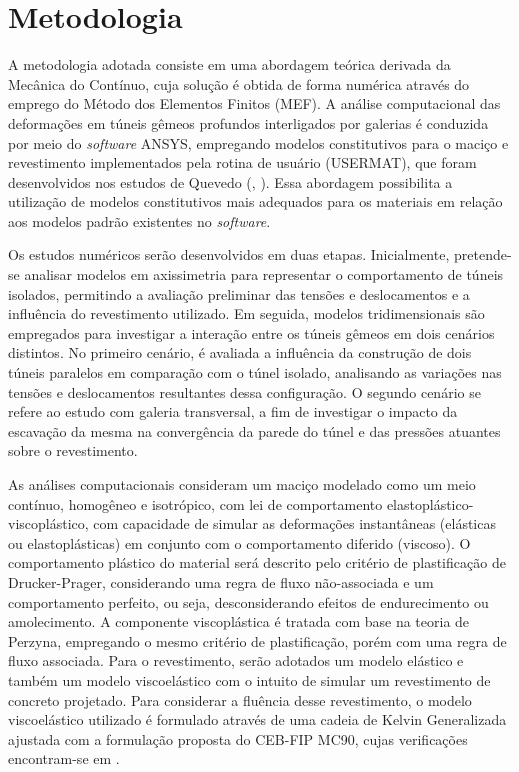 \section{Metodologia}

A metodologia adotada consiste em uma abordagem teórica derivada da Mecânica do Contínuo, cuja solução é obtida de forma numérica através do emprego do Método dos Elementos Finitos (MEF). A análise computacional das deformações em túneis gêmeos profundos interligados por galerias é conduzida por meio do \textit{software} ANSYS, empregando modelos constitutivos para o maciço e revestimento implementados pela rotina de usuário (USERMAT), que foram desenvolvidos nos estudos de Quevedo (\citeyear{Quevedo2017}, \citeyear{Quevedo2021}). Essa abordagem possibilita a utilização de modelos constitutivos mais adequados para os materiais em relação aos modelos padrão existentes no \textit{software}.

Os estudos numéricos serão desenvolvidos em duas etapas. Inicialmente, pretende-se analisar modelos em axissimetria para representar o comportamento de túneis isolados, permitindo a avaliação preliminar das tensões e deslocamentos e a influência do revestimento utilizado. Em seguida, modelos tridimensionais são empregados para investigar a interação entre os túneis gêmeos em dois cenários distintos. No primeiro cenário, é avaliada a influência da construção de dois túneis paralelos em comparação com o túnel isolado, analisando as variações nas tensões e deslocamentos resultantes dessa configuração. O segundo cenário se refere ao estudo com galeria transversal, a fim de investigar o impacto da escavação da mesma na convergência da parede do túnel e das pressões atuantes sobre o revestimento.

As análises computacionais consideram um maciço modelado como um meio contínuo, homogêneo e isotrópico, com lei de comportamento elastoplástico-viscoplástico, com capacidade de simular as deformações instantâneas (elásticas ou elastoplásticas) em conjunto com o comportamento diferido (viscoso). O comportamento plástico do material será descrito pelo critério de plastificação de Drucker-Prager, considerando uma regra de fluxo não-associada e um comportamento perfeito, ou seja, desconsiderando efeitos de endurecimento ou amolecimento. A componente viscoplástica é tratada com base na teoria de Perzyna, empregando o mesmo critério de plastificação, porém com uma regra de fluxo associada. Para o revestimento, serão adotados um modelo elástico e também um modelo viscoelástico com o intuito de simular um revestimento de concreto projetado. Para considerar a fluência desse revestimento, o modelo viscoelástico utilizado é formulado através de uma cadeia de Kelvin Generalizada ajustada com a formulação proposta do CEB-FIP MC90, cujas verificações encontram-se em .

